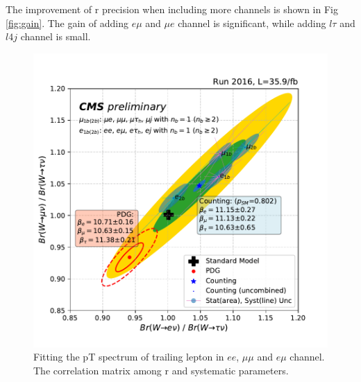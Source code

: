 The improvement of r precision when including more channels is shown in
Fig \ref{fig:gain}. The gain of adding $e\mu$ and $\mu e$ channel is
significant, while adding $l \tau$ and $l4j$ channel is small.


\begin{figure}[p]
    \centering
    \includegraphics[width=14cm]{chapters/Analysis/sectionResult/figures/r2}
    \caption{Fitting the pT spectrum of trailing lepton in $ee$, $\mu\mu$ and $e\mu$ channel.
    The correlation matrix among r and systematic parameters.
    }
    \label{fig:covr}
\end{figure}